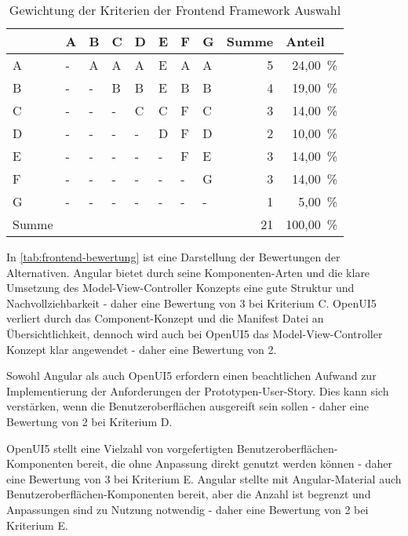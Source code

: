 \begin{table}[h]
	\caption{Gewichtung der Kriterien der Frontend Framework Auswahl}
	\begin{center}
		\begin{tabular}{llllllllrr}
			\toprule
			      & A & B & C & D & E & F & G & \multicolumn{1}{l}{Summe} & \multicolumn{1}{l}{Anteil} \\ \midrule
			A     & - & A & A & A & E & A & A &                         5 &                   24,00 \% \\
			B     & - & - & B & B & E & B & B &                         4 &                   19,00 \% \\
			C     & - & - & - & C & C & F & C &                         3 &                   14,00 \% \\
			D     & - & - & - & - & D & F & D &                         2 &                   10,00 \% \\
			E     & - & - & - & - & - & F & E &                         3 &                   14,00 \% \\
			F     & - & - & - & - & - & - & G &                         3 &                   14,00 \% \\
			G     & - & - & - & - & - & - & - &                         1 &                    5,00 \% \\
			Summe &   &   &   &   &   &   &   &                        21 &                  100,00 \% \\ \bottomrule
		\end{tabular}
	\end{center}
	\label{tab:frontend-gewichtung}
\end{table}

In \autoref{tab:frontend-bewertung} ist eine Darstellung der Bewertungen der Alternativen.
Angular bietet durch seine Komponenten-Arten und die klare Umsetzung des Model-View-Controller Konzepts eine gute Struktur und Nachvollziehbarkeit - daher eine Bewertung von 3 bei Kriterium C.
OpenUI5 verliert durch das Component-Konzept und die Manifest Datei an Übersichtlichkeit, dennoch wird auch bei OpenUI5 das Model-View-Controller Konzept klar angewendet - daher eine Bewertung von 2.

Sowohl Angular als auch OpenUI5 erfordern einen beachtlichen Aufwand zur Implementierung der Anforderungen der Prototypen-User-Story. Dies kann sich verstärken, wenn die Benutzeroberflächen ausgereift sein sollen - daher eine Bewertung von 2 bei Kriterium D.

OpenUI5 stellt eine Vielzahl von vorgefertigten Benutzeroberflächen-Komponenten bereit, die ohne Anpassung direkt genutzt werden können - daher eine Bewertung von 3 bei Kriterium E.
Angular stellte mit Angular-Material auch Benutzeroberflächen-Komponenten bereit, aber die Anzahl ist begrenzt und Anpassungen sind zu Nutzung notwendig - daher eine Bewertung von 2 bei Kriterium E.


